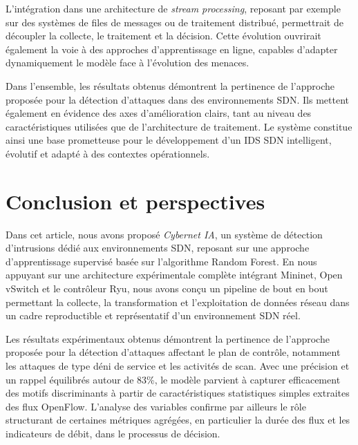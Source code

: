 \documentclass[11pt]{article}
\begin{document}
L’intégration dans une architecture de \textit{stream processing}, reposant par exemple sur des systèmes de files de messages ou de traitement distribué, permettrait de découpler la collecte, le traitement et la décision. Cette évolution ouvrirait également la voie à des approches d’apprentissage en ligne, capables d’adapter dynamiquement le modèle face à l’évolution des menaces.

\medskip

Dans l’ensemble, les résultats obtenus démontrent la pertinence de l’approche proposée pour la détection d’attaques dans des environnements SDN. Ils mettent également en évidence des axes d’amélioration clairs, tant au niveau des caractéristiques utilisées que de l’architecture de traitement. Le système constitue ainsi une base prometteuse pour le développement d’un IDS SDN intelligent, évolutif et adapté à des contextes opérationnels.













\section{Conclusion et perspectives}\label{sec:conclusion}

Dans cet article, nous avons proposé \textit{Cybernet IA}, un système de détection d’intrusions dédié aux environnements SDN, reposant sur une approche d’apprentissage supervisé basée sur l’algorithme Random Forest. En nous appuyant sur une architecture expérimentale complète intégrant Mininet, Open vSwitch et le contrôleur Ryu, nous avons conçu un pipeline de bout en bout permettant la collecte, la transformation et l’exploitation de données réseau dans un cadre reproductible et représentatif d’un environnement SDN réel.

Les résultats expérimentaux obtenus démontrent la pertinence de l’approche proposée pour la détection d’attaques affectant le plan de contrôle, notamment les attaques de type déni de service et les activités de scan. Avec une précision et un rappel équilibrés autour de 83\%, le modèle parvient à capturer efficacement des motifs discriminants à partir de caractéristiques statistiques simples extraites des flux OpenFlow. L’analyse des variables confirme par ailleurs le rôle structurant de certaines métriques agrégées, en particulier la durée des flux et les indicateurs de débit, dans le processus de décision.
\end{document}
